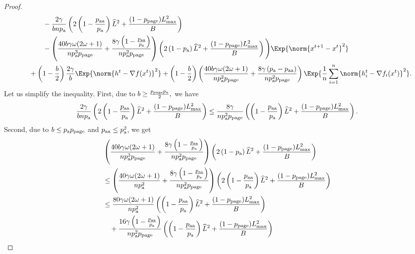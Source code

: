 \documentclass{article}
\newcommand*{\probavailable}{\ensuremath{p_{\textnormal{a}}}}
\newcommand*{\probpairaa}{\ensuremath{p_{\textnormal{aa}}}}
\newcommand*{\probpage}{\ensuremath{p_{\text{page}}}}
\begin{document}
\begin{proof}
\begin{align*}
      &\qquad\quad - \frac{2 \gamma}{b n \probavailable}\left(2 \left(1 - \frac{\probpairaa}{\probavailable}\right) \widehat{L}^2 + \frac{(1 - \probpage)L_{\max}^2}{B}\right) \\
      &\qquad\quad- \left(\frac{40 b \gamma \omega (2 \omega + 1)}{n \probavailable^3 \probpage} + \frac{8 \gamma \left(1 - \frac{\probpairaa}{\probavailable}\right)}{n \probavailable^2 \probpage}\right) \left(2\left(1 - \probavailable\right)\widehat{L}^2 + \frac{(1 - \probpage)L_{\max}^2}{B}\right)\Bigg) \Exp{\norm{x^{t+1} - x^t}^2} \\
      &\quad + \left(1 - \frac{b}{2}\right)\frac{2\gamma}{b}\Exp{\norm{h^{t} - \nabla f(x^{t})}^2} + \left(1 - \frac{b}{2}\right)\left(\frac{40 b \gamma \omega (2 \omega + 1)}{n \probavailable^2 \probpage} + \frac{8 \gamma \left(\probavailable - \probpairaa\right)}{n \probavailable^2 \probpage}\right)\Exp{\frac{1}{n}\sum_{i=1}^n\norm{h^{t}_i - \nabla f_i(x^{t})}^2}.
    \end{align*}
    Let us simplify the inequality. First, due to $b \geq \frac{\probpage \probavailable}{2},$ we have
    $$\frac{2\gamma}{b n \probavailable}\left(2 \left(1 - \frac{\probpairaa}{\probavailable}\right) \widehat{L}^2 + \frac{(1 - \probpage)L_{\max}^2}{B}\right) \leq \frac{8 \gamma}{n \probavailable^2 \probpage}\left(\left(1 - \frac{\probpairaa}{\probavailable}\right) \widehat{L}^2 + \frac{(1 - \probpage)L_{\max}^2}{B}\right).$$
    Second, due to $b \leq \probavailable \probpage$ and $\probpairaa \leq \probavailable^2$, we get
    \begin{align*}
      &\left(\frac{40 b \gamma \omega (2 \omega + 1)}{n \probavailable^3 \probpage} + \frac{8 \gamma \left(1 - \frac{\probpairaa}{\probavailable}\right)}{n \probavailable^2 \probpage}\right) \left(2\left(1 - \probavailable\right)\widehat{L}^2 + \frac{(1 - \probpage)L_{\max}^2}{B}\right) \\
      &\leq \left(\frac{40 \gamma \omega (2 \omega + 1)}{n \probavailable^2} + \frac{8 \gamma \left(1 - \frac{\probpairaa}{\probavailable}\right)}{n \probavailable^2 \probpage}\right) \left(2\left(1 - \frac{\probpairaa}{\probavailable}\right)\widehat{L}^2 + \frac{(1 - \probpage)L_{\max}^2}{B}\right) \\
      &\leq \frac{80 \gamma \omega (2 \omega + 1)}{n \probavailable^2} \left(\left(1 - \frac{\probpairaa}{\probavailable}\right)\widehat{L}^2 + \frac{(1 - \probpage)L_{\max}^2}{B}\right) \\
      &\quad + \frac{16 \gamma \left(1 - \frac{\probpairaa}{\probavailable}\right)}{n \probavailable^2 \probpage} \left(\left(1 - \frac{\probpairaa}{\probavailable}\right)\widehat{L}^2 + \frac{(1 - \probpage)L_{\max}^2}{B}\right) \\

\end{align*}
\end{proof}
\end{document}
